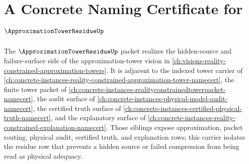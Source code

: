\chapter{A Concrete Naming Certificate for $\ApproximationTowerResidueUp$}
\label{ch:concrete-instances-approximation-tower-residue-namecert}

The $\ApproximationTowerResidueUp$ packet realizes the hidden-source and failure-surface side of the approximation-tower vision in \autoref{ch:visions-reality-constrained-approximation-towers}. It is adjacent to the indexed tower carrier of \autoref{ch:concrete-instances-reality-constrained-approximation-tower-namecert}, the finite tower packet of \autoref{ch:concrete-instances-realityconstrainedtowerpacket-namecert}, the audit surface of \autoref{ch:concrete-instances-physical-model-audit-namecert}, the certified truth surface of \autoref{ch:concrete-instances-certified-physical-truth-namecert}, and the explanatory surface of \autoref{ch:concrete-instances-reality-constrained-explanation-namecert}. Those siblings expose approximation, packet routing, physical audit, certified truth, and explanation rows; this carrier isolates the residue row that prevents a hidden source or failed compression from being read as physical adequacy.

